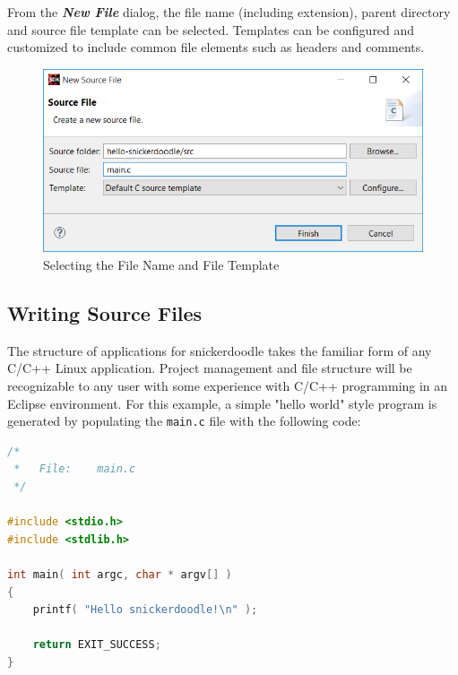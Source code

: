 \begin{fullwidth}
\end{fullwidth}

\noindent
From the \textit{\bfseries New File} dialog, the file name (including extension), parent directory and source file template can be selected. Templates can be configured and customized to include common file elements such as headers and comments. \\

\begin{figure}[h!]
	\centering
	\includegraphics{images/New_Main.png}
	\caption{Selecting the File Name and File Template}
\end{figure}

\subsection{Writing Source Files}
The structure of applications for snickerdoodle takes the familiar form of any C/C++ Linux application. Project management and file structure will be recognizable to any user with some experience with C/C++ programming in an Eclipse environment. For this example, a simple "hello world" style program is generated by populating the \texttt{main.c} file with the following code: \\

\begin{lstlisting}[language=c]
/*
 *   File:    main.c
 */

#include <stdio.h>
#include <stdlib.h>

int main( int argc, char * argv[] )
{
    printf( "Hello snickerdoodle!\n" );

    return EXIT_SUCCESS;
}
\end{lstlisting}



